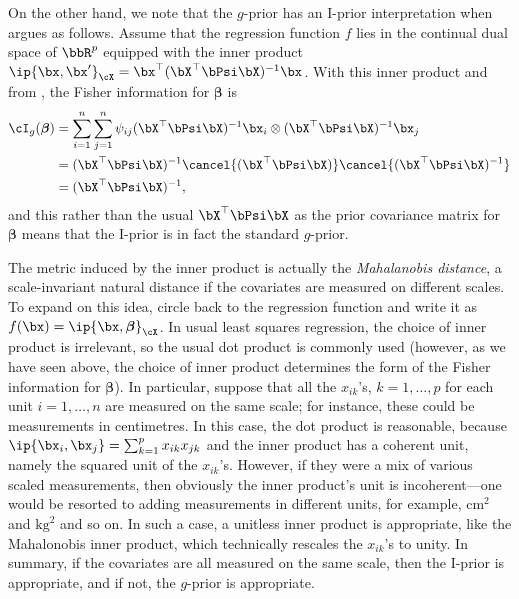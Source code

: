 On the other hand, we note that the $g$-prior has an I-prior interpretation when argues as follows.
Assume that the regression function $f$ lies in the continual dual space of $\bbR^p$ equipped with the inner product $\ip{\bx,\bx'}_\cX = \bx^\top(\bX^\top \bPsi \bX)^{-1}\bx$.
With this inner product and from , the Fisher information for $\boldsymbol{\beta}$ is
\begin{align*}
  \cI_g(\boldsymbol\beta) 
  &= \sum_{i=1}^n \sum_{j=1}^n \psi_{ij} (\bX^\top \bPsi \bX)^{-1}\bx_i \otimes (\bX^\top \bPsi \bX)^{-1}\bx_j \\
  &= (\bX^\top \bPsi \bX)^{-1} \cancel{(\bX^\top \bPsi \bX)} \cancel{(\bX^\top \bPsi \bX)^{-1}} \\
  &= (\bX^\top \bPsi \bX)^{-1},
\end{align*}
and this rather than the usual $\bX^\top \bPsi \bX$ as the prior covariance matrix for $\boldsymbol{\beta}$ means that the I-prior is in fact the standard $g$-prior.

The metric induced by the inner product is actually the \emph{Mahalanobis distance}, a scale-invariant natural distance if the covariates are measured on different scales.
To expand on this idea, circle back to the regression function and write it as $f(\bx) = \ip{\bx,\boldsymbol\beta}_\cX$.
In usual least squares regression, the choice of inner product is irrelevant, so the usual dot product is commonly used (however, as we have seen above, the choice of inner product determines the form of the Fisher information for $\boldsymbol{\beta}$).
In particular, suppose that all the $x_{ik}$'s, $k=1,\dots,p$ for each unit $i=1,\dots,n$ are measured on the same scale; for instance, these could be measurements in centimetres.
In this case, the dot product is reasonable, because $\ip{\bx_i,\bx_j} = \sum_{k=1}^p x_{ik}x_{jk}$ and the inner product has a coherent unit, namely the squared unit of the $x_{ik}$'s.
However, if they were a mix of various scaled measurements, then obviously the inner product's unit is incoherent---one would be resorted to adding measurements in different units, for example, $\text{cm}^2$ and $\text{kg}^2$ and so on.
In such a case, a unitless inner product is appropriate, like the Mahalonobis inner product, which technically rescales the $x_{ik}$'s to unity.
In summary, if the covariates are all measured on the same scale, then the I-prior is appropriate, and if not, the $g$-prior is appropriate.

